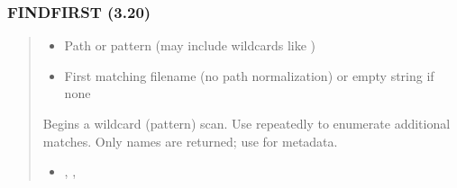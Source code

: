 \documentclass[letterpaper,10pt,english]{sphinxmanual}
\begin{document}
\subsubsection{FINDFIRST (3.20)}
\label{\detokenize{ppl:id5}}\begin{quote}

\sphinxAtStartPar
{}
\begin{description}
\begin{itemize}
\item {} 
\sphinxAtStartPar
{} \textendash{} Path or pattern (may include wildcards like )

\end{itemize}

\begin{itemize}
\item {} 
\sphinxAtStartPar
First matching filename (no path normalization) or empty string if none

\end{itemize}

\sphinxAtStartPar
Begins a wildcard (pattern) scan. Use  repeatedly to enumerate
additional matches. Only names are returned; use  for metadata.

\end{description}

\sphinxAtStartPar
{}
\begin{quote}

\begin{sphinxVerbatim}[commandchars=\\\{\}]
 
  
   
     
      
      
\end{sphinxVerbatim}
\end{quote}
\begin{description}
\begin{itemize}
\item {} 
\sphinxAtStartPar
{}, , 


\end{itemize}
\end{description}
\end{quote}
\end{document}
